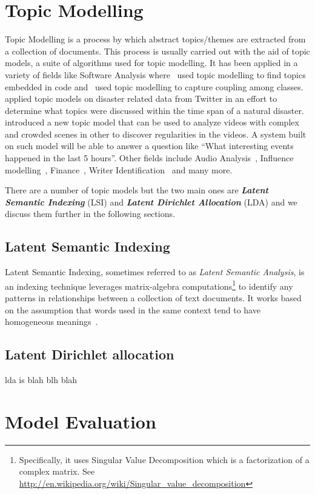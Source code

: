 \section{Topic Modelling}
\label{sec:bg_topic_modelling}
Topic Modelling is a process by which abstract topics/themes are extracted from a collection of
documents. This process is usually carried out with the aid of topic models, a suite of algorithms
used for topic modelling. It has been applied in a variety of fields like Software Analysis
where~\cite{linstead2009software} used topic modelling to find topics embedded in code
and~\cite{gethers2010using} used topic modelling to capture coupling among
classes.~\cite{kireyev2009applications} applied topic models on disaster related data from Twitter
in an effort to determine what topics were discussed within the time span of a natural
disaster.~\cite{hospedales2009markov} introduced a new topic model that can be used to analyze
videos with complex and crowded scenes in other to discover regularities in the videos. A system
built on such model will be able to answer a question like ``What interesting events happened in the
last 5 hours''. Other fields include Audio Analysis~\cite{smaragdis2009topic}, Influence
modelling~\cite{gerrish2009modeling}, Finance~\cite{doyle2009financial}, Writer
Identification~\cite{bhardwaj2009writer} and many more.

There are a number of topic models but the two main ones are \textbf{\textit{Latent Semantic
Indexing}} (LSI) and \textbf{\textit{Latent Dirichlet Allocation}} (LDA) and we discuss them further
in the following sections.


\subsection{Latent Semantic Indexing}
\label{sub:bg_lsa}
Latent Semantic Indexing, sometimes referred to as \textit{Latent Semantic Analysis}, is an indexing
technique leverages matrix-algebra computations\footnote{Specifically, it uses Singular Value
Decomposition which is a factorization of a complex matrix. See
\url{http://en.wikipedia.org/wiki/Singular_value_decomposition}} to identify any patterns in
relationships between a collection of text documents. It works based on the assumption that words
used in the same context tend to have homogeneous
meanings~\cite{deerwester1990indexing,dumais2004latent,landauer2006latent}.

\subsection{Latent Dirichlet allocation}
\label{sub:bg_lda}
lda is blah blh blah


\section{Model Evaluation}
\label{sec:bg_model_evaluation}

